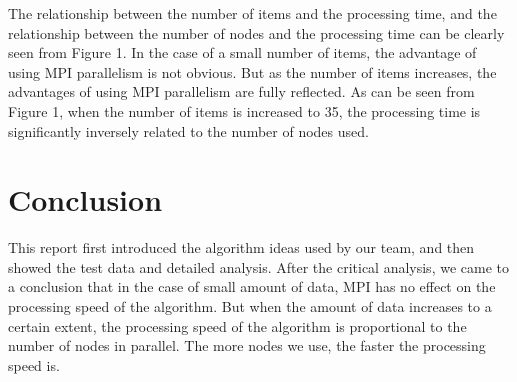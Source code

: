 \documentclass[12pt, a4paper, twocolumn]{article}
\begin{document}
    The relationship between the number of items and the processing time, and the relationship between the number of nodes and the processing time can be clearly seen from Figure 1. In the case of a small number of items, the advantage of using MPI parallelism is not obvious. But as the number of items increases, the advantages of using MPI parallelism are fully reflected. As can be seen from Figure 1, when the number of items is increased to 35, the processing time is significantly inversely related to the number of nodes used.

    \section{Conclusion}
    This report first introduced the algorithm ideas used by our team, and then showed the test data and detailed analysis. After the critical analysis, we came to a conclusion that in the case of small amount of data, MPI has no effect on the processing speed of the algorithm. But when the amount of data increases to a certain extent, the processing speed of the algorithm is proportional to the number of nodes in parallel. The more nodes we use, the faster the processing speed is.
\end{document}

